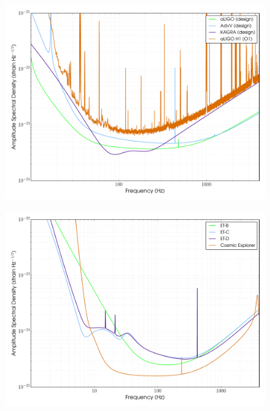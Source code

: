 \begin{figure}[]
\begin{center}
\includegraphics[width=1\columnwidth]{./figures/advcurves/advcurves}
\caption{ \protect}
\end{center}
\end{figure}


\begin{figure}[]
\begin{center}
\includegraphics[width=1\columnwidth]{./figures/etcurve/etcurve}
\caption{ \protect}
\end{center}
\end{figure}

